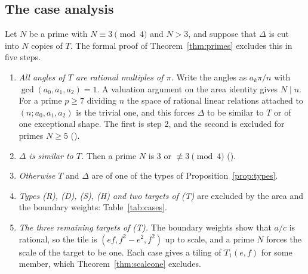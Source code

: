 \documentclass[11pt,reqno]{amsart}
\theoremstyle{plain}
\theoremstyle{definition}
\begin{document}
\subsection{The case analysis}\label{sub:cases}
Let $N$ be a prime with $N\equiv3\pmod4$ and $N>3$, and suppose that $\Delta$ is cut into $N$ copies of
$T$. The formal proof of Theorem~\ref{thm:primes} excludes this in five steps.
\begin{enumerate}
\item[1.] \emph{All angles of $T$ are rational multiples of $\pi$.} Write the angles as $a_k\pi/n$ with
$\gcd(a_0,a_1,a_2)=1$. A valuation argument on the area identity gives $N\mid n$. For a prime $p\ge7$
dividing $n$ the space of
rational linear relations attached to $(n;a_0,a_1,a_2)$ is the trivial one, and this forces $\Delta$ to be
similar to $T$ or of one exceptional shape. The first is step 2, and the second is excluded for primes
$N\ge5$ ().
\item[2.] \emph{$\Delta$ is similar to $T$.} Then a prime $N$ is $3$ or $\not\equiv3\pmod4$
().
\item[3.] \emph{Otherwise} $T$ and $\Delta$ are of one of the types of Proposition~\ref{prop:types}.
\item[4.] \emph{Types \textup{(R)}, \textup{(D)}, \textup{(S)}, \textup{(H)} and two targets of
\textup{(T)}} are excluded by the area and the boundary weights: Table~\ref{tab:cases}.
\item[5.] \emph{The three remaining targets of \textup{(T)}.} The boundary weights show that $a/c$ is
rational, so the tile is $(ef,f^2-e^2,f^2)$ up to scale, and a prime $N$ forces the scale of the target to
be one. Each case gives a tiling of $T_1(e,f)$ for some member, which Theorem~\ref{thm:scaleone} excludes.
\end{enumerate}
\end{document}
